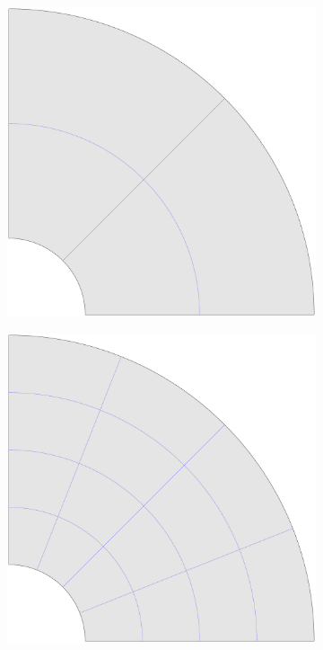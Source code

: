 \documentclass{article}
\begin{document}
\begin{figure}
\begin{subfigure}[b]{0.18\linewidth}
        \includegraphics[width=\linewidth]{mesh_hole_1}
    \end{subfigure}
    \begin{subfigure}[b]{0.18\linewidth}        %
        \centering
        \includegraphics[width=\linewidth]{mesh_hole_2}

\end{subfigure}
\end{figure}
\end{document}

